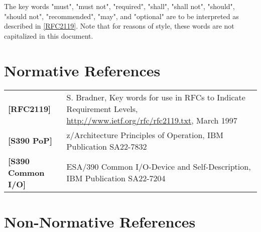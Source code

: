 The key words "must", "must not", "required", "shall", "shall
not", "should", "should not", "recommended", "may", and
"optional" are to be interpreted as
described in \hyperref[intro:rfc2119]{[RFC2119]}.  Note that for
reasons of style, these words are not capitalized in this
document.

\section{Normative References}

\begin{longtable}{l p{5in}}
	\label{intro:rfc2119}\textbf{[RFC2119]} & S. Bradner, Key words for use in RFCs to Indicate Requirement Levels, \newline\url{http://www.ietf.org/rfc/rfc2119.txt}, March 1997\\
	\label{intro:S390 PoP}\textbf{[S390 PoP]} & z/Architecture Principles of Operation, \newline IBM Publication SA22-7832\\
	\label{intro:S390 Common I/O}\textbf{[S390 Common I/O]} & ESA/390 Common I/O-Device and Self-Description, \newline IBM Publication SA22-7204\\
\end{longtable}


\section{Non-Normative References}


\newpage

